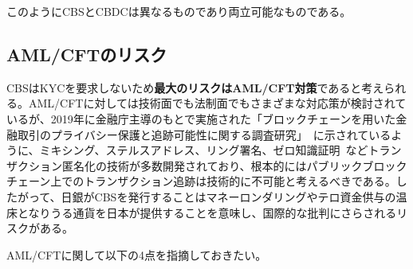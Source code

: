 \documentclass[dvipdfmx,a4paper]{jsarticle}
\begin{document}
このようにCBSとCBDCは異なるものであり両立可能なものである。

\subsection{AML/CFTのリスク}

CBSはKYCを要求しないため\textbf{最大のリスクはAML/CFT対策}であると考えられる。AML/CFTに対しては技術面でも法制面でもさまざまな対応策が検討されているが、2019年に金融庁主導のもとで実施された「ブロックチェーンを用いた金融取引のプライバシー保護と追跡可能性に関する調査研究」~\cite{blockchainprivacy}に示されているように、ミキシング、ステルスアドレス、リング署名、ゼロ知識証明~\cite{sasson2014zerocash}などトランザクション匿名化の技術が多数開発されており、根本的にはパブリックブロックチェーン上でのトランザクション追跡は技術的に不可能と考えるべきである。したがって、日銀がCBSを発行することはマネーロンダリングやテロ資金供与の温床となりうる通貨を日本が提供することを意味し、国際的な批判にさらされるリスクがある。

AML/CFTに関して以下の4点を指摘しておきたい。
\end{document}
